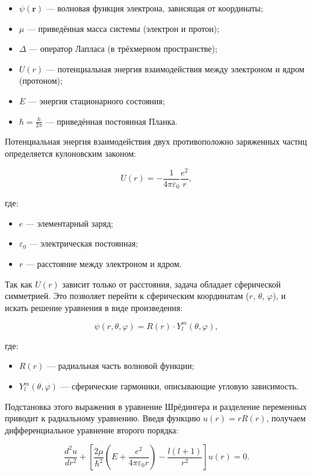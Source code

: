 \documentclass[12pt]{article}
\begin{document}
\begin{itemize}
    \item $\psi(\mathbf{r})$ — волновая функция электрона, зависящая от координаты;
    \item $\mu$ — приведённая масса системы (электрон и протон);
    \item $\Delta$ — оператор Лапласа (в трёхмерном пространстве);
    \item $U(r)$ — потенциальная энергия взаимодействия между электроном и ядром (протоном);
    \item $E$ — энергия стационарного состояния;
    \item $\hbar = \frac{h}{2\pi}$ — приведённая постоянная Планка.
\end{itemize}

Потенциальная энергия взаимодействия двух противоположно заряженных частиц определяется кулоновским законом:

\[
U(r) = -\frac{1}{4\pi \varepsilon_0} \frac{e^2}{r},
\]

где:

\begin{itemize}
    \item $e$ — элементарный заряд;
    \item $\varepsilon_0$ — электрическая постоянная;
    \item $r$ — расстояние между электроном и ядром.
\end{itemize}

Так как $U(r)$ зависит только от расстояния, задача обладает сферической симметрией. Это позволяет перейти к сферическим координатам ($r$, $\theta$, $\varphi$), и искать решение уравнения в виде произведения:

$$
\psi(r, \theta, \varphi) = R(r) \cdot Y_l^m(\theta, \varphi),
$$

где:

\begin{itemize}
    \item $R(r)$ — радиальная часть волновой функции;
    \item $Y_l^m(\theta, \varphi)$ — сферические гармоники, описывающие угловую зависимость.
\end{itemize}

Подстановка этого выражения в уравнение Шрёдингера и разделение переменных приводит к радиальному уравнению. Введя функцию $u(r) = r R(r)$, получаем дифференциальное уравнение второго порядка:

$$
\frac{d^2 u}{dr^2} + \left[ \frac{2\mu}{\hbar^2} \left( E + \frac{e^2}{4\pi \varepsilon_0 r} \right) - \frac{l(l+1)}{r^2} \right] u(r) = 0.
$$
\end{document}
